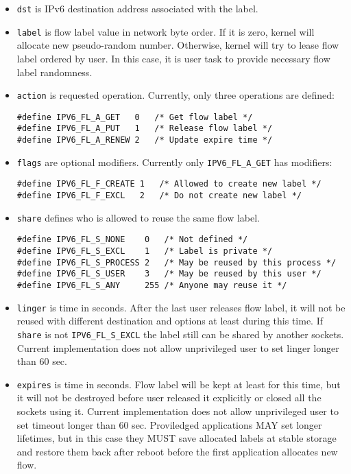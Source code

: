 \begin{itemize}

\item \verb|dst| is IPv6 destination address associated with the label.

\item \verb|label| is flow label value in network byte order. If it is zero,
kernel will allocate new pseudo-random number. Otherwise, kernel will try
to lease flow label ordered by user. In this case, it is user task to provide
necessary flow label randomness.

\item \verb|action| is requested operation. Currently, only three operations
are defined:

\begin{verbatim}
#define IPV6_FL_A_GET   0   /* Get flow label */
#define IPV6_FL_A_PUT   1   /* Release flow label */
#define IPV6_FL_A_RENEW 2   /* Update expire time */
\end{verbatim}

\item \verb|flags| are optional modifiers. Currently
only \verb|IPV6_FL_A_GET| has modifiers:

\begin{verbatim}
#define IPV6_FL_F_CREATE 1   /* Allowed to create new label */
#define IPV6_FL_F_EXCL   2   /* Do not create new label */
\end{verbatim}


\item \verb|share| defines who is allowed to reuse the same flow label.

\begin{verbatim}
#define IPV6_FL_S_NONE    0   /* Not defined */
#define IPV6_FL_S_EXCL    1   /* Label is private */
#define IPV6_FL_S_PROCESS 2   /* May be reused by this process */
#define IPV6_FL_S_USER    3   /* May be reused by this user */
#define IPV6_FL_S_ANY     255 /* Anyone may reuse it */
\end{verbatim}

\item \verb|linger| is time in seconds. After the last user releases flow
label, it will not be reused with different destination and options at least
during this time. If \verb|share| is not \verb|IPV6_FL_S_EXCL| the label
still can be shared by another sockets. Current implementation does not allow
unprivileged user to set linger longer than 60 sec.

\item \verb|expires| is time in seconds. Flow label will be kept at least
for this time, but it will not be destroyed before user released it explicitly
or closed all the sockets using it. Current implementation does not allow
unprivileged user to set timeout longer than 60 sec. Proviledged applications
MAY set longer lifetimes, but in this case they MUST save allocated
labels at stable storage and restore them back after reboot before the first
application allocates new flow.

\end{itemize}

